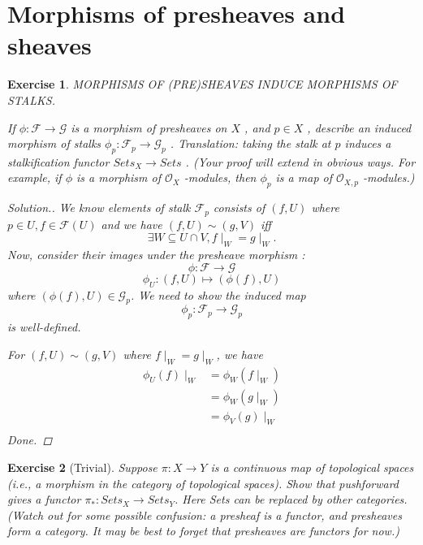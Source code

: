 \documentclass{article}
\theoremstyle{breakstyle}
\newtheorem{exercise}{Exercise}[section]
\newenvironment{solution}
  {\begin{proof}[Solution.]\renewcommand{\qedsymbol}{}}
  {\end{proof}}
\begin{document}
\section{Morphisms of presheaves and sheaves}

\begin{exercise}
MORPHISMS OF (PRE)SHEAVES INDUCE MORPHISMS OF STALKS.

If $\phi\colon\mathcal{F}\to\mathcal{G}$ is a morphism of presheaves on $X$ ,
and $p\in X$ , describe an induced morphism of stalks
$\phi_{p}\colon\mathcal{F}_{p}\to\mathcal{G}_{p}$ . Translation: taking the
stalk at $p$ induces a stalkification functor $Sets_{X}\to Sets$ . (Your proof
will extend in obvious ways. For example, if $\phi$ is a morphism of
$\mathcal{O}_{X}$ -modules, then $\phi_{p}$ is a map of $\mathcal{O}_{X,p}$
-modules.)

\begin{solution}
    We know elements of stalk $\mathscr{F}_{p}$ consists of $(f,U)$ where $p\in
    U,f\in \mathscr{F}(U)$ and we have $(f,U)\sim(g,V)$ iff
    $$
    \exists W\subseteq U\cap V,f\mid _{W}=g\mid _{W}
    .$$
    Now, consider their images under the presheave morphism
    :
    $$
    \phi:\mathscr{F}\longrightarrow \mathscr{G}
    $$
    $$
    \phi_{U}:\left( f,U \right) \longmapsto \left( \phi\left( f \right) ,U
    \right) 
    $$
    where $\left( \phi\left( f \right) ,U \right) \in \mathscr{G}_{p}$.
    We need to show the induced map
    $$
    \phi_{p}:\mathscr{F}_{p}\longrightarrow \mathscr{G}_{p}
    $$
    is well-defined.

    For
    $\left( f,U \right) \sim\left( g,V \right) $ where $f\mid _{W}=g\mid _{W}$,
    we have
    \begin{align*}
        \phi_{U}\left( f \right)\mid _{W}
        &= \phi_{W}\left( f\mid _{W} \right) \\
        &= \phi_{W}\left( g\mid _{W} \right) \\
        &= \phi_{V}\left( g \right) \mid _{W} \\
    \end{align*}
    Done.
\end{solution}

\end{exercise}

\begin{exercise}[Trivial]
Suppose $\pi\colon X \to Y$ is a continuous map of topological spaces (i.e., a
morphism in the category of topological spaces). Show that pushforward gives a
functor $\pi_{*}\colon Sets_{X} \to Sets_{Y}$. Here Sets can be replaced by
other categories. (Watch out for some possible confusion: a presheaf is a
functor, and presheaves form a category. It may be best to forget that
presheaves are functors for now.)
\end{exercise}
\end{document}
